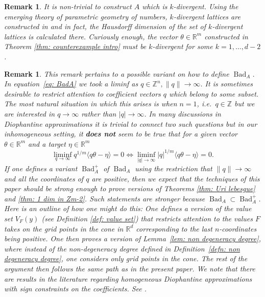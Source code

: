 \documentclass[reqno,11pt, twoside]{amsart}
\theoremstyle{plain}
\newtheorem{rem}[thm]{Remark}
\theoremstyle{definition}
\theoremstyle{definition}
\theoremstyle{remark}
\numberwithin{equation}{section}
\newcommand{\R}{{\mathbb{R}}}
\newcommand{\bR}{\mathbb{R}}
\newcommand{\bZ}{\mathbb{Z}}
\newcommand\norm[1]{\|#1\|}
\newcommand\idist[1]{\langle#1\rangle}
\newcommand\av[1]{|#1|}
\newcommand\on[1]{\operatorname{#1}}
\begin{document}
\begin{rem}
    It is non-trivial to construct $A$ which is $k$-divergent. Using 
    the emerging theory of \textit{parametric geometry of numbers}, $k$-divergent lattices are constructed in \cite{LRSY} and in fact, the Hausdorff dimension of the set of $k$-divergent lattices is calculated there. Curiously enough, the vector $\theta \in \R^m$ constructed in Theorem \ref{thm: counterexample intro} must be $k$-divergent for some $k=1,\dots, d-2$.
\end{rem}

\begin{rem}
This remark pertains to a possible variant on how to define $\on{Bad}_A$.
In equation~\eqref{eq: BadA} we took a liminf as $q\in \bZ^n, \norm{q}\to\infty$. It is sometimes desirable to restrict attention to coefficient vectors $q$ which belong to some subset. The most natural situation in which this arises is when $n=1$, i.e.\ $q\in \bZ$ but we are interested in $q\to \infty$ rather than $\av{q}\to \infty$. In many discussions in Diophantine approximations it is trivial to connect two such questions but in our inhomogeneous setting, 
it \textbf{does not} seem to be true that for a given vector $\theta\in \bR^m$ and a target $\eta\in \bR^m$  
$$\liminf_{q\to \infty}q^{1/m}\idist{q\theta-\eta}=0\Longleftrightarrow \liminf_{\av{q}\to\infty}\av{q}^{1/m}\idist{q\theta-\eta} = 0.$$
If one defines a variant $\on{Bad}_A^+$ of $\on{Bad}_A$ using the restriction that 
$\norm{q}\to\infty$ and all the coordinates of $q$ are positive, then we expect that the techniques of this paper should be strong enough to prove versions of Theorems \ref{thm: Uri lebesgue} and \ref{thm: 1 dim in Zm-2}. Such statements are stronger because $\on{Bad}_A\subset \on{Bad}_A^+$. 
Here is an outline of how one might do this: One defines a version of the value set $V_F(y)$ (see Definition \ref{def: value set}) that 
restricts attention to the values $F$ takes on the grid points in the cone
in $\bR^d$ corresponding to the last $n$-coordinates being positive. One then proves a version of Lemma~\ref{lem: non degeneracy degree}, where instead of the non-degeneracy degree defined in Definition~\ref{defn: non degeneracy degree}, one considers only grid points in the cone. The rest of the argument then follows the same path as in the present paper. We note that there are results in the literature regarding homogeneous Diophantine approximations
with sign constraints on the coefficients. See \cite{SchmidtPositiveCoef, Thurnheer1, Thurnheer2, MoshchevitinPositive, RoyPositive}.
\end{rem}
\end{document}
